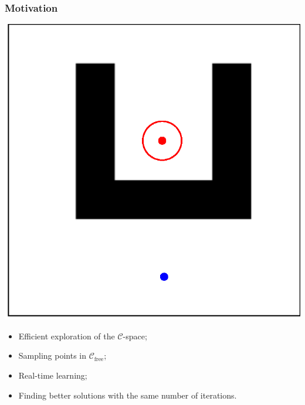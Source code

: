 \documentclass{beamer}
\begin{document}
\begin{frame}
	\frametitle{Motivation}	
	\noindent
	\begin{minipage}[t]{0.49\textwidth}
	  \vspace{0pt}
	  \includegraphics[width=\textwidth]{figChap4/SimpleMaze.eps} 
	\end{minipage}
	\hfill
	\begin{minipage}[t]{0.49\textwidth}
	  \vspace{1cm}
	  \vfill
    \begin{center} %
      \begin{itemize}
        \item Efficient exploration of the \(\mathcal{C}\)-space;
        \vspace{0.2cm}
        \item Sampling points in \(\mathcal{C}_\text{free}\);
        \vspace{0.2cm}
		\item Real-time learning;
        \vspace{0.2cm}
		\item Finding better solutions with the same number of iterations.
      \end{itemize}
    \end{center}
    \vfill
	\end{minipage}
  \end{frame}
\end{document}
